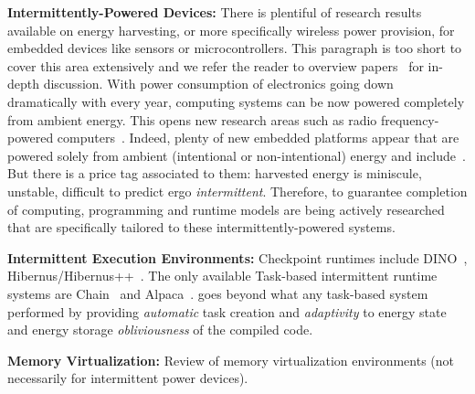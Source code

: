 \noindent \textbf{Intermittently-Powered Devices:} There is plentiful of research results available on energy harvesting, or more specifically wireless power provision, for embedded devices like sensors or microcontrollers. This paragraph is too short to cover this area extensively and we refer the reader to overview papers~\cite{prasad_comst_2014,sample_procieee_2013,huang:commag:2015,visser_procieee_2013,kamalinejad_commag_2015,ku_cst_2016} for in-depth discussion. With power consumption of electronics going down dramatically with every year, computing systems can be now powered completely from ambient energy. This opens new research areas such as radio frequency-powered computers~\cite{patel_pervasive_2017,rf_powered_computing_gollakota_2014}. Indeed, plenty of new embedded platforms appear that are powered solely from ambient (intentional or non-intentional) energy and include~\cite{wisp5,moo,zhao_rfid_2015,holleman_biocas_2008,thomas_jbcs_2012,naderiparizi_rfid_2015,rodriguez_tbcs_2015,liu_sigcomm_2013,kicksat,nadeau_naturebio_2017}. But there is a price tag associated to them: harvested energy is miniscule, unstable, difficult to predict ergo \emph{intermittent}. Therefore, to guarantee completion of computing, programming and runtime models are being actively researched that are specifically tailored to these intermittently-powered systems. 

\noindent \textbf{Intermittent Execution Environments:} Checkpoint runtimes include DINO~\cite{dino}, Hibernus/Hibernus++~\cite{hibernus,hibernusplusplus}. The only available Task-based intermittent runtime systems are Chain~\cite{chain} and Alpaca~\cite{alpaca}. \sys goes beyond what any task-based system performed by providing \emph{automatic} task creation and \emph{adaptivity} to energy state and energy storage \emph{obliviousness} of the compiled code. 

\noindent \textbf{Memory Virtualization:} Review of memory virtualization environments (not necessarily for intermittent power devices). 